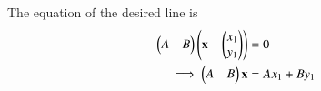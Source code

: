 The equation of the desired line is
\begin{align}
	\begin{pmatrix}A &B\end{pmatrix}\left(\mathbf{x}-\begin{pmatrix}x_1\\y_1\end{pmatrix}\right)&=0\\
	\implies 
	\begin{pmatrix}A &B\end{pmatrix}\mathbf{x} &= Ax_1+By_1
\end{align}
